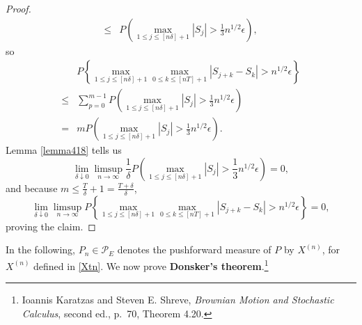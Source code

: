 \documentclass{article}
\theoremstyle{definition}
\theoremstyle{definition}
\begin{document}
\begin{proof}
\[\begin{split}
\leq&P\left(\max_{1 \leq j \leq [n\delta]+1} |S_j| > \frac{1}{3}n^{1/2}\epsilon\right),
\end{split}
\]
so
\[
\begin{split}
&P\left\{ \max_{1 \leq j \leq [n\delta]+1} \max_{0 \leq k \leq [nT]+1} |S_{j+k}-S_k| > n^{1/2} \epsilon\right\}\\
\leq&\sum_{p=0}^{m-1} P\left(\max_{1 \leq j \leq [n\delta]+1} |S_j| > \frac{1}{3}n^{1/2}\epsilon\right)\\
=&m P\left(\max_{1 \leq j \leq [n\delta]+1} |S_j| > \frac{1}{3}n^{1/2}\epsilon\right).
\end{split}
\]
 Lemma \ref{lemma418} tells us
 \[
\lim_{\delta \downarrow 0} \limsup_{n \to \infty} \frac{1}{\delta} P\left(\max_{1 \leq j \leq [n\delta]+1} |S_j| > \frac{1}{3}n^{1/2}\epsilon\right) = 0,
 \]
 and because $m \leq \frac{T}{\delta}+1 = \frac{T+\delta}{\delta}$, 
 \[
\lim_{\delta \downarrow 0} \limsup_{n \to \infty} P\left\{ \max_{1 \leq j \leq [n\delta]+1} \max_{0 \leq k \leq [nT]+1} |S_{j+k}-S_k| > n^{1/2} \epsilon\right\} = 0,
 \]
 proving the claim.
\end{proof}




In the following, $P_n \in \mathscr{P}_E$ denotes the pushforward measure of $P$ by $X^{(n)}$, for $X^{(n)}$ defined in \eqref{Xtn}.
We now prove \textbf{Donsker's theorem}.\footnote{Ioannis Karatzas and Steven E. Shreve,
{\em Brownian Motion and Stochastic Calculus}, second ed., p.~70, Theorem 4.20.}
\end{document}
